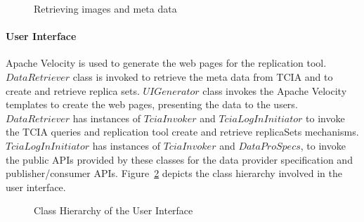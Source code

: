 \documentclass[conference]{IEEEtran}
\begin{document}
\begin{figure}[!htbp]
\begin{center}
\end{center}
 \caption{Retrieving images and meta data}
 \label{fig:methods}
\end{figure}

\paragraph*{User Interface} Apache Velocity is used to generate the web pages for the replication tool. $DataRetriever$ class is invoked to retrieve the meta data from TCIA and to create and retrieve replica sets. $UIGenerator$ class invokes the Apache Velocity templates to create the web pages, presenting the data to the users. $DataRetriever$ has instances of $TciaInvoker$ and $TciaLogInInitiator$ to invoke the TCIA queries and replication tool create and retrieve replicaSets mechanisms. $TciaLogInInitiator$ has instances of $TciaInvoker$ and $DataProSpecs$, to invoke the public APIs provided by these classes for the data provider specification and publisher/consumer APIs. Figure~\ref{fig:classUX} depicts the class hierarchy involved in the user interface.
\begin{figure}[!htbp]
\begin{center}
\end{center}
 \caption{Class Hierarchy of the User Interface}
 \label{fig:classUX}
\end{figure}
\end{document}
